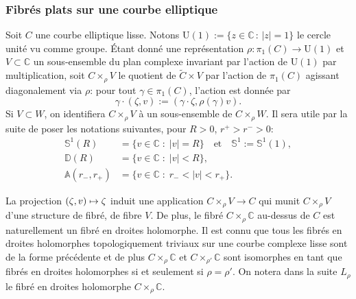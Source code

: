 \documentclass[JEP,XML,SOM,Unicode,francais,published]{cedram}
\newcommand\mto{\mathchoice{\longmapsto}{\mapsto}{\mapsto}{\mapsto}}
\newcommand{\C}{\mathbb{C}}
\newcommand{\rU}{\mathrm{U}}
\newcommand*\abs[1]{\left|#1\right|}
\theoremstyle{definition}
\begin{document}
\subsubsection*{Fibrés plats sur une courbe elliptique}
Soit $C$ une courbe elliptique lisse. Notons $\rU(1):= \{z\in \C\,:\,\abs{z} = 1\}$ le cercle unité vu comme groupe. Étant donné une représentation $\rho \colon \pi_1(C) \to \rU(1)$ et $V \subset \C$ un sous-ensemble du plan complexe invariant par l'action de $\rU(1)$ par multiplication, soit $C \times_\rho V$ le quotient de $\tilde{C} \times V$ par l'action de $\pi_1(C)$ agissant diagonalement via $\rho$: pour tout $\gamma \in \pi_1(C)$, l'action est donnée par
\[\gamma \cdot (\zeta, v):= (\gamma \cdot \zeta, \rho(\gamma)v).\]
Si $V \subset W$, on identifiera $C \times_\rho V$ à un sous-ensemble de $C \times_\rho W$. Il sera utile par la suite de poser les notations suivantes, pour $R > 0$, $r^+ > r^- > 0$:
\begin{align*}
\mathbb{S}^1(R) &= \{v\in\C\;:\;|v| = R\} \quad\text{et}\quad \mathbb{S}^1:= \mathbb{S}^1(1),\\
\mathbb{D}(R) &= \{v\in\C\;:\;|v| < R\},\\
\mathbb{A}(r_{-}, r_{+}) &= \{v\in\C\;:\;r_{-}<|v|<r_{+}\}.
\end{align*}

La projection $(\zeta, v) \mto \zeta$ induit une application $C \times_\rho V \to C$ qui munit $C \times_\rho V$ d'une structure de fibré, de fibre $V$. De plus, le fibré $C \times_\rho \C$ au-dessus de $C$ est naturellement un fibré en droites holomorphe. Il est connu que tous les fibrés en droites holomorphes topologiquement triviaux sur une courbe complexe lisse sont de la forme précédente et de plus $C \times_\rho \C$ et $C \times_{\rho'} \C$ sont isomorphes en tant que fibrés en droites holomorphes si et seulement si $\rho = \rho'$.
On notera dans la suite $L_\rho$ le fibré en droites holomorphe $C \times_\rho \C$.
\end{document}
